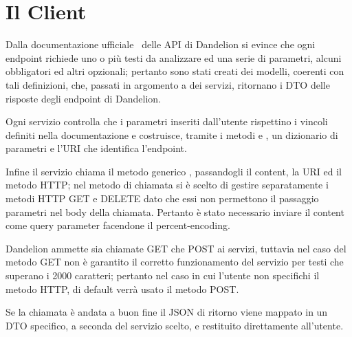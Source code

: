 \section{Il Client}

Dalla documentazione ufficiale~\cite{dandelion-doc} delle API di Dandelion si evince che ogni endpoint richiede uno o più testi da analizzare ed una serie di parametri, 
alcuni obbligatori ed altri opzionali; 
pertanto sono stati creati dei modelli, coerenti con tali definizioni, che, passati in argomento a dei servizi, ritornano i DTO delle risposte degli endpoint di Dandelion.

Ogni servizio controlla che i parametri inseriti dall'utente rispettino i vincoli definiti nella documentazione e costruisce, tramite i metodi  e  
, un dizionario di parametri e l'URI che identifica l'endpoint. 

Infine il servizio chiama il metodo generico , passandogli il content, la URI ed il metodo HTTP; 
nel metodo di chiamata si è scelto di gestire separatamente i metodi HTTP GET e DELETE dato che essi non permettono il passaggio parametri nel body 
della chiamata. Pertanto è stato necessario inviare il content come query parameter facendone il percent-encoding.

Dandelion ammette sia chiamate GET che POST ai servizi, tuttavia nel caso del metodo GET non è garantito il corretto 
funzionamento del servizio per testi che superano i 2000 caratteri; pertanto nel caso in cui l'utente non specifichi il metodo HTTP, di default verrà
usato il metodo POST.

Se la chiamata è andata a buon fine il JSON di ritorno viene mappato in un DTO specifico, a seconda del servizio scelto, e restituito direttamente all'utente.

